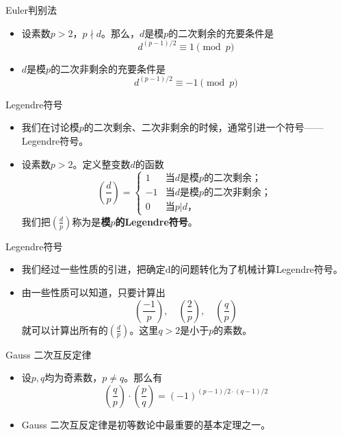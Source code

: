 \documentclass[dvipdfmx]{beamer}
\newcommand{\bbold}[1]{\textbf{#1}}
\begin{document}
\begin{frame}{Euler判别法}
\begin{itemize}
\item 设素数$p>2$，$p\nmid d$。那么，$d$是模$p$的二次剩余的充要条件是
\begin{displaymath}
d^{(p-1)/2}\equiv 1\pmod{p}
\end{displaymath}
\pause
\item $d$是模$p$的二次非剩余的充要条件是
\begin{displaymath}
d^{(p-1)/2}\equiv -1\pmod{p}
\end{displaymath}
\end{itemize}
\end{frame}

\begin{frame}{Legendre符号}
\begin{itemize}
\item 我们在讨论模$p$的二次剩余、二次非剩余的时候，通常引进一个符号——Legendre符号。
\pause
\item 设素数$p>2$。定义整变数$d$的函数
\begin{displaymath}
\left( \frac{d}{p} \right) =
  \begin{cases}
  1 & \text{当$d$是模$p$的二次剩余；}\\
  -1 & \text{当$d$是模$p$的二次非剩余；}\\
  0 & \text{当$p|d$，}
  \end{cases}
\end{displaymath}
我们把$(\frac{d}{p})$称为是\bbold{模$p$的Legendre符号}。
\end{itemize}
\end{frame}

\begin{frame}{Legendre符号}
\begin{itemize}
\item 我们经过一些性质的引进，把确定d的问题转化为了机械计算Legendre符号。
\item 由一些性质可以知道，只要计算出
\begin{displaymath}
\left(\frac{-1}{p}\right),\quad \left(\frac{2}{p}\right),\quad \left(\frac{q}{p}\right)
\end{displaymath}
就可以计算出所有的$\left(\frac{d}{p}\right)$。这里$q>2$是小于$p$的素数。
\end{itemize}
\end{frame}

\begin{frame}{Gauss 二次互反定律}
\begin{itemize}
\item 设$p,q$均为奇素数，$p\neq q$。那么有
\begin{displaymath}
\left(\frac{q}{p}\right)\cdot\left(\frac{p}{q}\right)=(-1)^{(p-1)/2\cdot(q-1)/2}
\end{displaymath}
\item Gauss 二次互反定律是初等数论中最重要的基本定理之一。
\end{itemize}
\end{frame}
\end{document}
